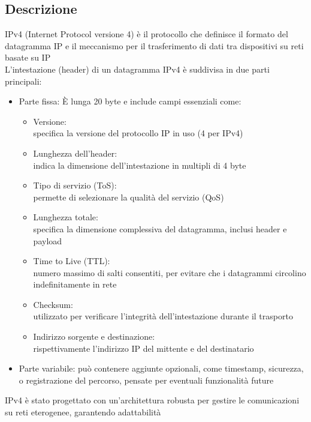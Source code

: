 \documentclass[10pt,oneside,a4paper]{article}
\begin{document}
\subsection{Descrizione}
IPv4 (Internet Protocol versione 4) è il protocollo che definisce il formato del datagramma IP e il meccanismo per il trasferimento di dati tra dispositivi su reti basate su IP\\
L'intestazione (header) di un datagramma IPv4 è suddivisa in due parti principali:
\begin{itemize}
\item Parte fissa: È lunga 20 byte e include campi essenziali come:
\begin{itemize}
\item Versione:\\
specifica la versione del protocollo IP in uso (4 per IPv4)
\item Lunghezza dell'header:\\
indica la dimensione dell'intestazione in multipli di 4 byte
\item Tipo di servizio (ToS):\\
permette di selezionare la qualità del servizio (QoS)
\item Lunghezza totale:\\
specifica la dimensione complessiva del datagramma, inclusi header e payload
\item Time to Live (TTL):\\
numero massimo di salti consentiti, per evitare che i datagrammi circolino indefinitamente in rete
\item Checksum:\\
utilizzato per verificare l'integrità dell'intestazione durante il trasporto
\item Indirizzo sorgente e destinazione:\\
rispettivamente l'indirizzo IP del mittente e del destinatario
\end{itemize}
\item Parte variabile: può contenere aggiunte opzionali, come timestamp, sicurezza, o registrazione del percorso, pensate per eventuali funzionalità future
\end{itemize}
IPv4 è stato progettato con un'architettura robusta per gestire le comunicazioni su reti eterogenee, garantendo adattabilità
\end{document}
